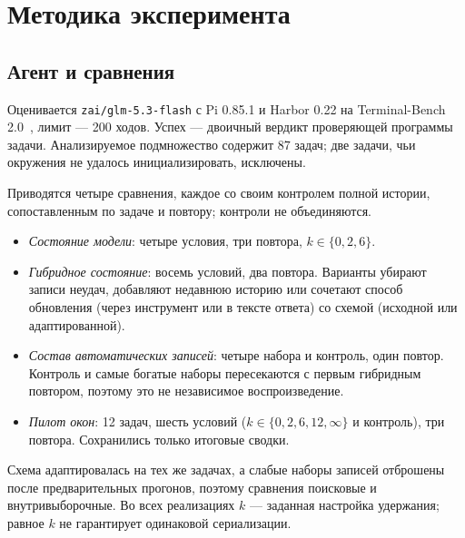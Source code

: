 \section{Методика эксперимента}
\label{sec:setup}
\subsection{Агент и сравнения}
Оценивается \texttt{zai/glm-5.3-flash} с Pi 0.85.1 и Harbor 0.22
на Terminal-Bench 2.0~\citep{terminalbench}, лимит --- 200 ходов.
Успех --- двоичный вердикт проверяющей программы задачи. Анализируемое
подмножество содержит 87 задач; две задачи, чьи окружения не удалось
инициализировать, исключены.

Приводятся четыре сравнения, каждое со своим контролем полной истории,
сопоставленным по задаче и повтору; контроли не объединяются.
\begin{itemize}\itemsep0pt
\item \emph{Состояние модели}: четыре условия, три повтора,
 $k\in\{0,2,6\}$.
\item \emph{Гибридное состояние}: восемь условий, два повтора. Варианты
 убирают записи неудач, добавляют недавнюю историю или сочетают
 способ обновления (через инструмент или в тексте ответа) со схемой
 (исходной или адаптированной).
\item \emph{Состав автоматических записей}: четыре набора и контроль,
 один повтор. Контроль и самые богатые наборы пересекаются с первым
 гибридным повтором, поэтому это не независимое воспроизведение.
\item \emph{Пилот окон}: 12 задач, шесть условий ($k\in\{0,2,6,12,\infty\}$
 и контроль), три повтора. Сохранились только итоговые сводки.
\end{itemize}
Схема адаптировалась на тех же задачах, а слабые наборы записей
отброшены после предварительных прогонов, поэтому сравнения поисковые
и внутривыборочные. Во всех реализациях $k$ --- заданная настройка
удержания; равное $k$ не гарантирует одинаковой сериализации.

